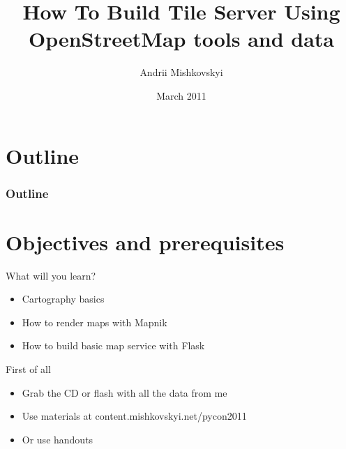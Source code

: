 \documentclass[17pt]{beamer}
\begin{document}
\title{How To Build Tile Server Using OpenStreetMap tools and data}
\author{Andrii Mishkovskyi}
\date{March 2011}

\maketitle



\section*{Outline}

\begin{frame}
  \frametitle{Outline}
  \tableofcontents
\end{frame}

\section{Objectives and prerequisites}

\begin{frame}{What will you learn?}
  \begin{itemize}
  \item Cartography basics
  \item How to render maps with Mapnik
  \item How to build basic map service with Flask
  \end{itemize}
\end{frame}

\begin{frame}{First of all}
  \begin{itemize}
  \item Grab the CD or flash with all the data from me
  \item Use materials at content.mishkovskyi.net/pycon2011
  \item Or use handouts
  \end{itemize}
\end{frame}
\end{document}
